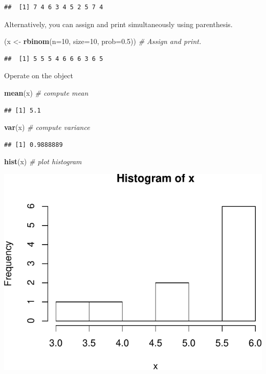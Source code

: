 \documentclass[]{book}
\newenvironment{Shaded}{\begin{snugshade}}{\end{snugshade}}
\newcommand{\CommentTok}[1]{\textcolor[rgb]{0.56,0.35,0.01}{\textit{#1}}}
\newcommand{\DataTypeTok}[1]{\textcolor[rgb]{0.13,0.29,0.53}{#1}}
\newcommand{\DecValTok}[1]{\textcolor[rgb]{0.00,0.00,0.81}{#1}}
\newcommand{\FloatTok}[1]{\textcolor[rgb]{0.00,0.00,0.81}{#1}}
\newcommand{\KeywordTok}[1]{\textcolor[rgb]{0.13,0.29,0.53}{\textbf{#1}}}
\newcommand{\NormalTok}[1]{#1}
\newcommand{\StringTok}[1]{\textcolor[rgb]{0.31,0.60,0.02}{#1}}
\theoremstyle{definition}
\theoremstyle{definition}
\theoremstyle{definition}
\theoremstyle{remark}
\begin{document}
\begin{verbatim}
##  [1] 7 4 6 3 4 5 2 5 7 4
\end{verbatim}

Alternatively, you can assign and print simultaneously using parenthesis.

\begin{Shaded}
\begin{Highlighting}[]
\NormalTok{(x <-}\StringTok{ }\KeywordTok{rbinom}\NormalTok{(}\DataTypeTok{n=}\DecValTok{10}\NormalTok{, }\DataTypeTok{size=}\DecValTok{10}\NormalTok{, }\DataTypeTok{prob=}\FloatTok{0.5}\NormalTok{))  }\CommentTok{# Assign and print.}
\end{Highlighting}
\end{Shaded}

\begin{verbatim}
##  [1] 5 5 5 4 6 6 6 3 6 5
\end{verbatim}

Operate on the object

\begin{Shaded}
\begin{Highlighting}[]
\KeywordTok{mean}\NormalTok{(x)  }\CommentTok{# compute mean}
\end{Highlighting}
\end{Shaded}

\begin{verbatim}
## [1] 5.1
\end{verbatim}

\begin{Shaded}
\begin{Highlighting}[]
\KeywordTok{var}\NormalTok{(x)  }\CommentTok{# compute variance}
\end{Highlighting}
\end{Shaded}

\begin{verbatim}
## [1] 0.9888889
\end{verbatim}

\begin{Shaded}
\begin{Highlighting}[]
\KeywordTok{hist}\NormalTok{(x) }\CommentTok{# plot histogram}
\end{Highlighting}
\end{Shaded}

\includegraphics[width=0.5\linewidth]{Rcourse_files/figure-latex/unnamed-chunk-15-1}
\end{document}
